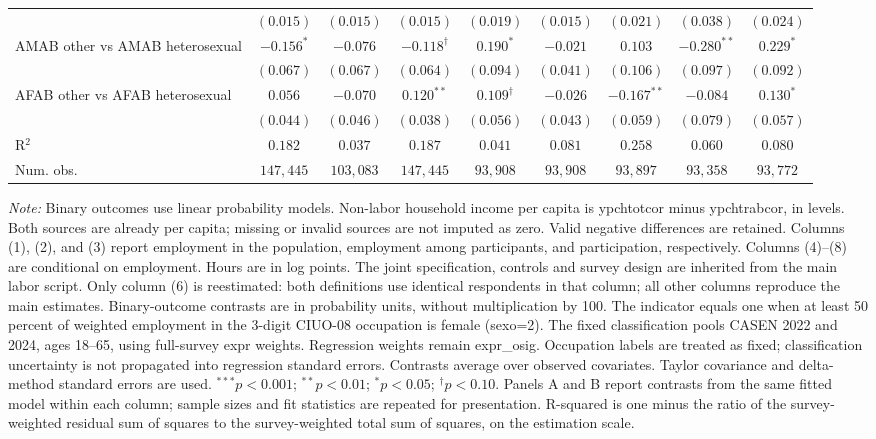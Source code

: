 \begin{table}[htpb!]
{\begin{tabular}{l c c c c c c c c}
 & $(0.015)$ & $(0.015)$ & $(0.015)$ & $(0.019)$ & $(0.015)$ & $(0.021)$ & $(0.038)$ & $(0.024)$ \\
AMAB other vs AMAB heterosexual & $-0.156^{*}$ & $-0.076$ & $-0.118^{\dagger}$ & $0.190^{*}$ & $-0.021$ & $0.103$ & $-0.280^{**}$ & $0.229^{*}$ \\
 & $(0.067)$ & $(0.067)$ & $(0.064)$ & $(0.094)$ & $(0.041)$ & $(0.106)$ & $(0.097)$ & $(0.092)$ \\
AFAB other vs AFAB heterosexual & $0.056$ & $-0.070$ & $0.120^{**}$ & $0.109^{\dagger}$ & $-0.026$ & $-0.167^{**}$ & $-0.084$ & $0.130^{*}$ \\
 & $(0.044)$ & $(0.046)$ & $(0.038)$ & $(0.056)$ & $(0.043)$ & $(0.059)$ & $(0.079)$ & $(0.057)$ \\
\hline
R$^2$ & $0.182$ & $0.037$ & $0.187$ & $0.041$ & $0.081$ & $0.258$ & $0.060$ & $0.080$ \\
Num. obs. & $147,445$ & $103,083$ & $147,445$ & $93,908$ & $93,908$ & $93,897$ & $93,358$ & $93,772$ \\
\hline
\end{tabular}%
}
\par\vspace{1ex}
\begin{minipage}{\textwidth}\footnotesize\raggedright
\textit{Note:} Binary outcomes use linear probability models. Non-labor household income per capita is ypchtotcor minus ypchtrabcor, in levels. Both sources are already per capita; missing or invalid sources are not imputed as zero. Valid negative differences are retained. Columns (1), (2), and (3) report employment in the population, employment among participants, and participation, respectively. Columns (4)--(8) are conditional on employment. Hours are in log points. The joint specification, controls and survey design are inherited from the main labor script. Only column (6) is reestimated: both definitions use identical respondents in that column; all other columns reproduce the main estimates. Binary-outcome contrasts are in probability units, without multiplication by 100. The indicator equals one when at least 50 percent of weighted employment in the 3-digit CIUO-08 occupation is female (sexo=2). The fixed classification pools CASEN 2022 and 2024, ages 18--65, using full-survey expr weights. Regression weights remain expr\_osig. Occupation labels are treated as fixed; classification uncertainty is not propagated into regression standard errors. Contrasts average over observed covariates. Taylor covariance and delta-method standard errors are used. $^{***}p<0.001$; $^{**}p<0.01$; $^{*}p<0.05$; $^{\dagger}p<0.10$. Panels A and B report contrasts from the same fitted model within each column; sample sizes and fit statistics are repeated for presentation. R-squared is one minus the ratio of the survey-weighted residual sum of squares to the survey-weighted total sum of squares, on the estimation scale.
\end{minipage}
\end{table}
